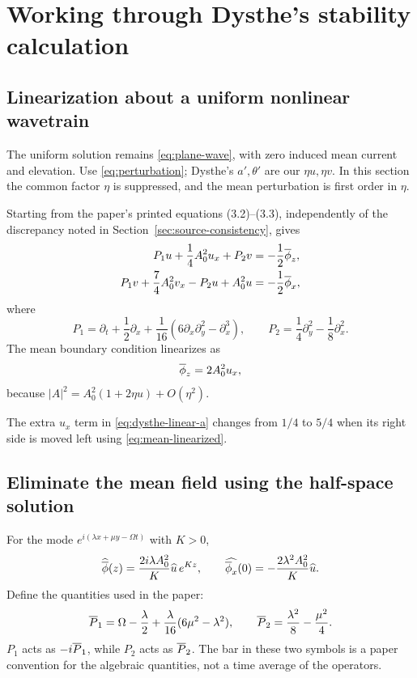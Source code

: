 \section{Working through Dysthe's stability calculation}
\label{sec:stability}
\subsection{Linearization about a uniform nonlinear wavetrain}
The uniform solution remains \eqref{eq:plane-wave}, with zero induced mean
current and elevation. Use \eqref{eq:perturbation}; Dysthe's $a',\theta'$
are our $\eta u,\eta v$. In this section the common factor $\eta$ is
suppressed, and the mean perturbation is first order in $\eta$.

Starting from the paper's printed equations (3.2)--(3.3), independently of
the discrepancy noted in Section~\ref{sec:source-consistency}, gives
\begin{align}
 P_1u+\frac14A_0^2u_x+P_2v&=-\frac12\overline{\phi}_z,
 \label{eq:dysthe-linear-a}\\
 P_1v+\frac74A_0^2v_x-P_2u+A_0^2u&=-\frac12\overline{\phi}_x,
 \label{eq:dysthe-linear-b}
\end{align}
where
\[
 P_1=\partial_t+\frac12\partial_x
 +\frac1{16}(6\partial_x\partial_y^2-\partial_x^3),
 \qquad P_2=\frac14\partial_y^2-\frac18\partial_x^2.
\]
The mean boundary condition linearizes as
\begin{equation}\label{eq:mean-linearized}
 \overline{\phi}_z=2A_0^2u_x,
\end{equation}
because $|A|^2=A_0^2(1+2\eta u)+O(\eta^2)$.

The extra $u_x$ term in \eqref{eq:dysthe-linear-a} changes from $1/4$ to
$5/4$ when its right side is moved left using \eqref{eq:mean-linearized}.

\subsection{Eliminate the mean field using the half-space solution}
For the mode $e^{i(\lambda x+\mu y-\Omega t)}$ with $K>0$,
\[
 \widehat{\overline{\phi}}(z)=\frac{2i\lambda A_0^2}{K}\widehat u\,e^{Kz},
 \qquad
 \widehat{\overline{\phi}_x}(0)=-\frac{2\lambda^2A_0^2}{K}\widehat u.
\]
Define the quantities used in the paper:
\begin{equation}\label{eq:Pbars}
 \overline{P}_1=\Omega-\frac\lambda2+\frac{\lambda}{16}(6\mu^2-\lambda^2),
 \qquad \overline{P}_2=\frac{\lambda^2}{8}-\frac{\mu^2}{4}.
\end{equation}
$P_1$ acts as $-i\overline{P}_1$, while $P_2$ acts as $\overline{P}_2$.
The bar in these two symbols is a paper convention for the algebraic
quantities, not a time average of the operators.

